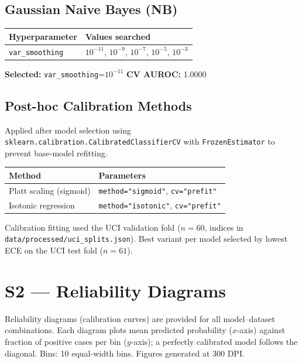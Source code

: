 \documentclass[11pt]{article}
\begin{document}
\subsection*{Gaussian Naive Bayes (NB)}

\begin{center}
\begin{tabular}{ll}
\toprule
Hyperparameter & Values searched \\
\midrule
\texttt{var\_smoothing} & $10^{-11}$, $10^{-9}$, $10^{-7}$, $10^{-5}$, $10^{-3}$ \\
\bottomrule
\end{tabular}
\end{center}

\noindent\textbf{Selected:} \texttt{var\_smoothing}=$10^{-11}$\quad
\textbf{CV AUROC:} 1.0000

\subsection*{Post-hoc Calibration Methods}

Applied after model selection using
\texttt{sklearn.calibration.CalibratedClassifierCV} with
\texttt{FrozenEstimator} to prevent base-model refitting.

\begin{center}
\begin{tabular}{ll}
\toprule
Method & Parameters \\
\midrule
Platt scaling (sigmoid) & \texttt{method="sigmoid"}, \texttt{cv="prefit"} \\
Isotonic regression     & \texttt{method="isotonic"}, \texttt{cv="prefit"} \\
\bottomrule
\end{tabular}
\end{center}

Calibration fitting used the UCI validation fold ($n=60$, indices in
\texttt{data/processed/uci\_splits.json}). Best variant per model selected
by lowest ECE on the UCI test fold ($n=61$).

\clearpage

\section*{S2 — Reliability Diagrams}

Reliability diagrams (calibration curves) are provided for all
model--dataset combinations. Each diagram plots mean predicted probability
($x$-axis) against fraction of positive cases per bin ($y$-axis); a
perfectly calibrated model follows the diagonal. Bins: 10 equal-width
bins. Figures generated at 300 DPI.
\end{document}
